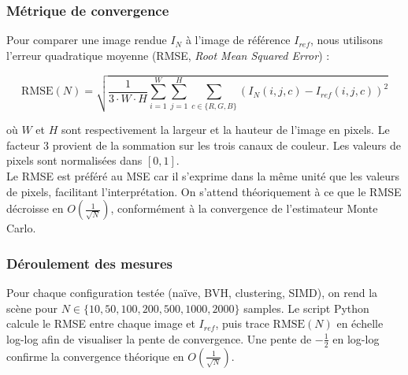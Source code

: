 \subsubsection{Métrique de convergence}

Pour comparer une image rendue $I_N$ à l'image de référence $I_{ref}$, 
nous utilisons l'erreur quadratique moyenne (RMSE, \textit{Root Mean 
Squared Error}) :

$$\text{RMSE}(N) = \sqrt{\frac{1}{3 \cdot W \cdot H} \sum_{i=1}^{W} 
\sum_{j=1}^{H} \sum_{c \in \{R,G,B\}} 
\left(I_N(i,j,c) - I_{ref}(i,j,c)\right)^2}$$

où $W$ et $H$ sont respectivement la largeur et la hauteur de l'image 
en pixels. Le facteur $3$ provient de la sommation sur les trois canaux 
de couleur. Les valeurs de pixels sont normalisées dans $[0, 1]$.\\

Le RMSE est préféré au MSE car il s'exprime dans la même unité que les 
valeurs de pixels, facilitant l'interprétation. On s'attend théoriquement 
à ce que le RMSE décroisse en $O\left(\frac{1}{\sqrt{N}}\right)$, 
conformément à la convergence de l'estimateur Monte Carlo.\\

\subsubsection{Déroulement des mesures}

Pour chaque configuration testée (naïve, BVH, clustering, SIMD), on rend la 
scène pour $N \in \{10, 50, 100, 200, 500, 1000, 2000\}$ samples. Le 
script Python calcule le RMSE entre chaque image et $I_{ref}$, puis trace 
$\text{RMSE}(N)$ en échelle log-log afin de visualiser la pente de 
convergence. Une pente de $-\frac{1}{2}$ en log-log confirme la 
convergence théorique en $O\left(\frac{1}{\sqrt{N}}\right)$.